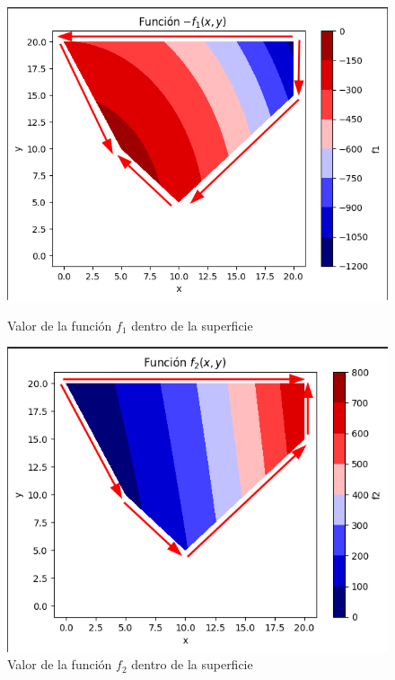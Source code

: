 \documentclass[12pt, letterpaper]{article}
\begin{document}
\begin{figure}[h]
    \centering
    \begin{minipage}{0.48\textwidth}
        \centering
        \includegraphics[width=\textwidth]{images/f1.png}
        \caption{Valor de la función $f_1$ dentro de la superficie\label{fig:f1}}
    \end{minipage}
    \hfill
    \begin{minipage}{0.48\textwidth}
        \centering
        \includegraphics[width=\textwidth]{images/f2.png}
        \caption{Valor de la función $f_2$ dentro de la superficie\label{fig:f2}}
    \end{minipage}
\end{figure}
\end{document}
